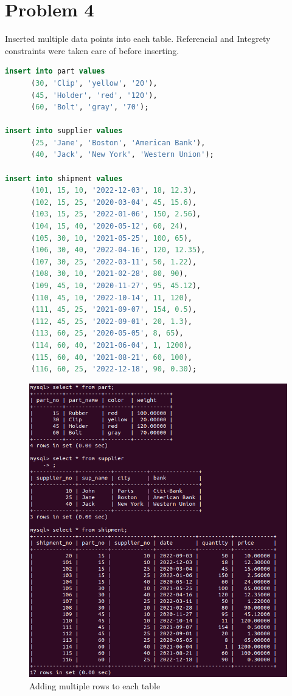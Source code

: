 \documentclass{article}
\begin{document}
\section{Problem 4}
Inserted multiple data points into each table. Referencial and Integrety constraints
were taken care of before inserting.
\begin{lstlisting}[language=sql]
insert into part values
      (30, 'Clip', 'yellow', '20'),
      (45, 'Holder', 'red', '120'),
      (60, 'Bolt', 'gray', '70');

insert into supplier values
      (25, 'Jane', 'Boston', 'American Bank'),
      (40, 'Jack', 'New York', 'Western Union');

insert into shipment values
      (101, 15, 10, '2022-12-03', 18, 12.3),
      (102, 15, 25, '2020-03-04', 45, 15.6),
      (103, 15, 25, '2022-01-06', 150, 2.56),
      (104, 15, 40, '2020-05-12', 60, 24),
      (105, 30, 10, '2021-05-25', 100, 65),
      (106, 30, 40, '2022-04-16', 120, 12.35),
      (107, 30, 25, '2022-03-11', 50, 1.22),
      (108, 30, 10, '2021-02-28', 80, 90),
      (109, 45, 10, '2020-11-27', 95, 45.12),
      (110, 45, 10, '2022-10-14', 11, 120),
      (111, 45, 25, '2021-09-07', 154, 0.5),
      (112, 45, 25, '2022-09-01', 20, 1.3),
      (113, 60, 25, '2020-05-05', 8, 65),
      (114, 60, 40, '2021-06-04', 1, 1200),
      (115, 60, 40, '2021-08-21', 60, 100),
      (116, 60, 25, '2022-12-18', 90, 0.30);
\end{lstlisting}
\newpage
\begin{figure}[!ht]
  \begin{center}
  \includegraphics[scale=1]{added_multiple_data_4.png}
  \caption{Adding multiple rows to each table}
  \end{center}
\end{figure}
\newpage
\end{document}
